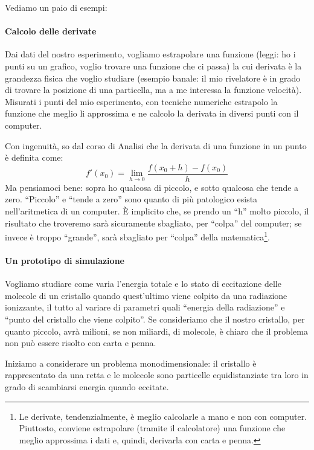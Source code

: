 	Vediamo un paio di esempi:
	
	\paragraph{Calcolo delle derivate}
	Dai dati del nostro esperimento, vogliamo estrapolare una funzione (leggi: ho i punti su un grafico, voglio trovare una funzione che ci passa) la cui derivata è la grandezza fisica che voglio studiare (esempio banale: il mio rivelatore è in grado di trovare la posizione di una particella, ma a me interessa la funzione velocità). Misurati i punti del mio esperimento, con tecniche numeriche estrapolo la funzione che meglio li approssima e ne calcolo la derivata in diversi punti con il computer. 
	
	Con ingenuità, so dal corso di Analisi che la derivata di una funzione in un punto è definita come:  $$f'(x_{0})= \lim\limits_{h\to0}\frac{f(x_{0}+h)-f(x_{0})}{h}$$
	Ma pensiamoci bene: sopra ho qualcosa di piccolo, e sotto qualcosa che tende a zero. ``Piccolo'' e ``tende a zero'' sono quanto di più patologico esista nell'aritmetica di un computer. È implicito che, se prendo un ``h'' molto piccolo, il risultato che troveremo sarà sicuramente sbagliato, per ``colpa'' del computer; se invece è troppo ``grande'', sarà sbagliato per ``colpa'' della matematica\footnote{Le derivate, tendenzialmente, è meglio calcolarle a mano e non con computer. Piuttosto, conviene estrapolare (tramite il calcolatore) una funzione che meglio approssima i dati e, quindi, derivarla con carta e penna.}.
	
	\paragraph{Un prototipo di simulazione} 	
	Vogliamo studiare come varia l'energia totale e lo stato di eccitazione delle molecole di un cristallo quando quest'ultimo viene colpito da una radiazione ionizzante, il tutto al variare di parametri quali ``energia della radiazione'' e ``punto del cristallo che viene colpito''. Se consideriamo che il nostro cristallo, per quanto piccolo, avrà milioni, se non miliardi, di molecole, è chiaro che il problema non può essere risolto con carta e penna. 
	
	Iniziamo a considerare un problema monodimensionale: il cristallo è rappresentato da una retta e le molecole sono particelle equidistanziate tra loro in grado di scambiarsi energia quando eccitate. 

